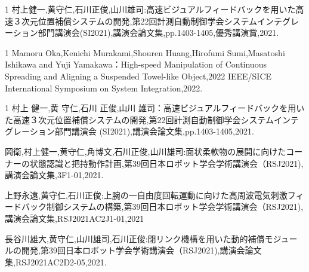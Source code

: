 \begin{受賞}{1}
村上健一,黄守仁,石川正俊,山川雄司:高速ビジュアルフィードバックを用いた高速３次元位置補償システムの開発,第22回計測自動制御学会システムインテグレーション部門講演会(SI2021),講演会論文集,pp.1403-1405,優秀講演賞,2021.

\end{受賞}

\begin{査読付}{1}
Mamoru Oka,Kenichi Murakami,Shouren Huang,Hirofumi Sumi,Masatoshi Ishikawa and Yuji Yamakawa：High-speed Manipulation of Continuous Spreading and Aligning a Suspended Towel-like Object,2022 IEEE/SICE International Symposium on System Integration,2022.

\end{査読付}

\begin{発表}{1}
村上 健一,黄 守仁,石川 正俊,山川 雄司：高速ビジュアルフィードバックを用いた高速３次元位置補償システムの開発,第22回計測自動制御学会システムインテグレーション部門講演会 (SI2021),講演会論文集,pp.1403-1405,2021.

岡衛,村上健一,黄守仁,角博文,石川正俊,山川雄司:面状柔軟物の展開に向けたコーナーの状態認識と把持動作計画,第39回日本ロボット学会学術講演会（RSJ2021),講演会論文集,3F1-01,2021.

上野永遠,黄守仁,石川正俊:上腕の一自由度回転運動に向けた高周波電気刺激フィードバック制御システムの構築,第39回日本ロボット学会学術講演会（RSJ2021),講演会論文集,RSJ2021AC2J1-01,2021

長谷川雄大,黄守仁,山川雄司,石川正俊:閉リンク機構を用いた動的補償モジュールの開発,第39回日本ロボット学会学術講演会（RSJ2021),講演会論文集,RSJ2021AC2D2-05,2021.

\end{発表}

